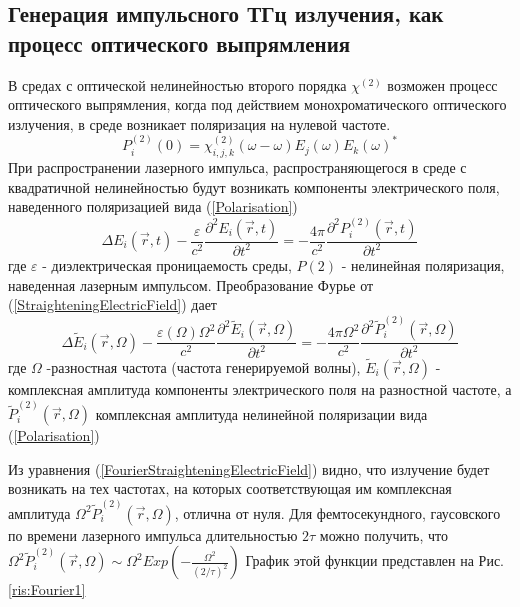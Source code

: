 \documentclass[a4paper,14pt,russian]{extreport}
\begin{document}
			\subsection{Генерация импульсного ТГц излучения, как процесс оптического выпрямления}
				В средах с оптической нелинейностью второго порядка $\chi^{(2)}$ возможен процесс оптического выпрямления, когда под действием монохроматического оптического излучения, в среде возникает поляризация на нулевой частоте.
				\begin{equation}\label{Polarisation}
					P_i^{(2)}(0) = \chi^{(2)}_{i,j,k}(\omega - \omega)E_j(\omega)E_k(\omega)^*
				\end{equation}
				При распространении лазерного импульса, распространяющегося в среде с квадратичной нелинейностью будут возникать компоненты электрического поля, наведенного поляризацией вида (\ref{Polarisation})
				\begin{equation}\label{StraighteningElectricField}
					\Delta E_i(\vec{r},t) - 
					\frac{\varepsilon}{c^2}\frac{\partial^2 E_i(\vec{r},t)}{\partial t^2} = 
					- \frac{4 \pi}{c^2} \frac{\partial^2 P_i^{(2)}(\vec{r},t)}{\partial t^2}
				\end{equation}
				где $\varepsilon$ - диэлектрическая проницаемость среды, $P{(2)}$ - нелинейная поляризация,
наведенная лазерным импульсом. Преобразование Фурье от (\ref{StraighteningElectricField}) дает
				\begin{equation}\label{FourierStraighteningElectricField}
					\Delta \tilde{E}_i(\vec{r},\Omega) - 
					\frac{\varepsilon(\Omega)\Omega^2}{c^2}\frac{\partial^2 \tilde{E}_i(\vec{r},\Omega)}{\partial t^2} = 
					- \frac{4 \pi \Omega^2}{c^2} \frac{\partial^2 \tilde{P}_i^{(2)}(\vec{r},\Omega)}{\partial t^2}
				\end{equation}
				где $\Omega$ -разностная частота (частота генерируемой волны), $\tilde{E}_i(\vec{r},\Omega)$ - комплексная амплитуда компоненты электрического поля на разностной частоте, а $\tilde{P}_i^{(2)}(\vec{r},\Omega)$ комплексная амплитуда нелинейной поляризации вида (\ref{Polarisation})\par
				Из уравнения (\ref{FourierStraighteningElectricField}) видно, что излучение будет возникать на тех частотах, на которых соответствующая им комплексная амплитуда $\Omega^2 \tilde{P}_i^{(2)}(\vec{r},\Omega)$, отлична от нуля. Для фемтосекундного, гаусовского по времени лазерного импульса длительностью $2\tau$ можно получить, что $\Omega^2 \tilde{P}_i^{(2)}(\vec{r},\Omega) \sim \Omega^2 Exp\left( - \frac{\Omega^2}{(2/\tau)^2}\right)$ График этой функции представлен на Рис. \ref{ris:Fourier1}\par
\end{document}
